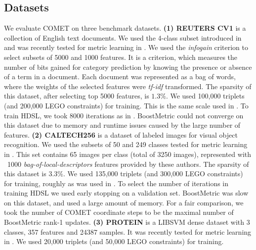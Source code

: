 \documentclass[twoside,11pt]{article}
\begin{document}
\subsection{Datasets}\vskip -5pt
We evaluate COMET on three benchmark datasets.
\textbf{(1) REUTERS CV1} is a collection of English text documents. We used the 4-class subset introduced in \citep{CaiRCV14} and was recently tested for metric learning in \citep{HDSL}. We used the \textit{infogain} criterion \citep{infogain} to select subsets of 5000 and 1000 features. It is a criterion, which measures the number of bits gained for category prediction by knowing the presence or absence of a term in a document. Each document was represented as a bag of words, where the weights of the selected features were \textit{tf-idf} transformed. The sparsity of this dataset, after selecting top 5000 features, is $1.3\%$. We used 100,000 triplets (and 200,000 LEGO constraints) for training. This is the same scale used in \citet{HDSL}. To train HDSL, we took 8000 iterations as in \citep{HDSL}. BoostMetric could not converge on this dataset due to memory and runtime issues caused by the large number of features. \textbf{(2) CALTECH256} is a dataset of labeled images for visual object recognition. We used the subsets of 50 and 249 classes tested for metric learning in \citep{OASIS}. This set contains 65 images per class (total of 3250 images), represented with ~1000 \textit{bag-of-local-descriptors} features provided by these authors. The sparsity of this dataset is $3.3\%$. We used 135,000 triplets (and 300,000 LEGO constraints) for training, roughly as was used in \citep{OASIS}. To select the number of iterations in training HDSL we used early stopping on a validation set. BoostMetric was slow on this dataset, and used a large amount of memory. For a fair comparison, we took the number of COMET coordinate steps to be the maximal number of BoostMetric rank-1 updates. \textbf{(3) PROTEIN} is a LIBSVM \citep{libsvm} dense dataset with 3 classes, 357 features and 24387 samples. It was recently tested for metric learning in \citep{qian}. We used 20,000 triplets (and 50,000 LEGO constraints) for training.
\end{document}
